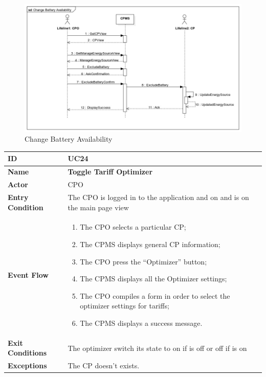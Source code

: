 \documentclass{Configuration_Files/PoliMi3i_thesis}
\begin{document}
\begin{figure}[H]
    \centering
    \includegraphics[width=1\textwidth]{Images/UseCases/Change Battery Availability.jpg}
    \caption{Change Battery Availability}
\end{figure}


\newpage\begin{table}[H]
    \begin{xltabular}{\textwidth}{| >{}l | X |}
    \hline
    \textbf{ID} & \textbf{UC24}\T\B\\
    \hline
    \textbf{Name} & \textbf{Toggle Tariff Optimizer}\T\B\\
    \hline \hline
    \textbf{Actor} & CPO\T\B \\
    \hline
    \textbf{Entry Condition} & The CPO is logged in to the application and on and is on the main page view\T\B\\
    \hline
    \textbf{Event Flow} & 
        \begin{enumerate}
        \item The CPO selects a particular CP;
        \item The CPMS displays general CP information;
        \item The CPO press the “Optimizer” button;
        \item The CPMS displays all the Optimizer settings;
        \item The CPO compiles a form in order to select the optimizer settings for tariffs;
        \item The CPMS displays a success message.
        \end{enumerate}\B\\
    \hline
    \textbf{Exit Conditions} & The optimizer switch its state to on if is off or off if is on \B\\
    \hline
    \textbf{Exceptions} & The CP doesn't exists.\B\\
    \hline
    \end{xltabular}
\end{table}
\end{document}

